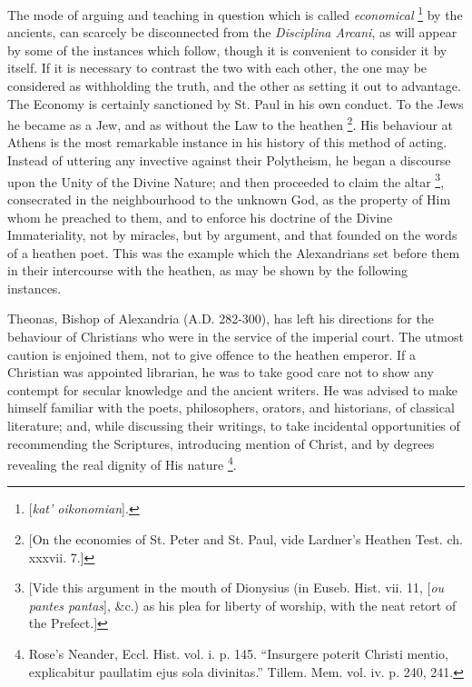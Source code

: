 The mode of arguing and teaching in question which is called \emph{economical}
\footnote{[\emph{kat' oikonomian}].} by the ancients, can
scarcely be disconnected from the \emph{Disciplina Arcani}, as will
appear by some of the instances which follow, though it is convenient
to consider it by itself. If it is necessary to contrast the two with
each other, the one may be considered as withholding the truth, and
the other as setting it out to advantage. The Economy is certainly
sanctioned by St. Paul in his own conduct. To the Jews he became as a
Jew, and as without the Law to the heathen \footnote{[On the economies of St. Peter and St.
Paul, vide Lardner's Heathen Test. ch. xxxvii. 7.]}. His behaviour at Athens is the most remarkable instance in
his history of this method of acting. Instead of uttering any
invective against their Polytheism, he began a discourse upon the
Unity of the Divine Nature; and then proceeded to claim the altar \footnote{[Vide this argument in the mouth of
Dionysius (in Euseb. Hist. vii. 11, [\emph{ou pantes pantas}],
\&c.) as his plea for liberty of worship, with the neat retort of
the Prefect.]}, consecrated in the neighbourhood to the unknown God, as
the property of Him whom he preached to them, and to enforce his
doctrine of the Divine Immateriality, not by miracles, but by
argument, and that founded on the words of a heathen poet. This was
the example which the Alexandrians set before them in their
intercourse with the heathen, as may be shown by the following
instances.

Theonas, Bishop of Alexandria (A.D. 282-300),
has left his directions for the behaviour of Christians who were in
the service of the imperial court. The utmost caution is enjoined
them, not to give offence to the heathen emperor. If a Christian was
appointed librarian, he was to take good care not to show any contempt
for secular knowledge and the ancient writers. He was advised to make
himself familiar with the poets, philosophers, orators, and
historians, of classical literature; and, while discussing their
writings, to take incidental opportunities of recommending the
Scriptures, introducing mention of Christ, and by degrees revealing
the real dignity of His nature \footnote{Rose's Neander, Eccl. Hist. vol. i. p.
145. ``Insurgere poterit Christi mentio, explicabitur paullatim
ejus sola divinitas.'' Tillem. Mem. vol. iv. p. 240, 241.}.

